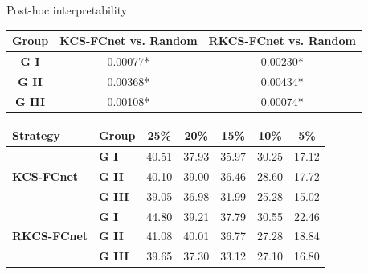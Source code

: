 \documentclass[aspectratio=169]{beamer}
\begin{document}
\begin{frame}{Post-hoc interpretability}
    \begin{table}[h!]
        \centering
        \begin{tabular}{|c|c|c|}
        \hline
        \textbf{Group} & \textbf{KCS-FCnet vs. Random} & \textbf{RKCS-FCnet vs. Random} \\ \hline
        \textbf{G I} & 0.00077* & 0.00230* \\
        \textbf{G II} & 0.00368* & 0.00434* \\
        \textbf{G III} & 0.00108* & 0.00074* \\ \hline
        \end{tabular}
        \end{table}

        \begin{table}[h!]
            \centering
            \begin{tabular}{|l|l|c|c|c|c|c|}
            \hline
            \textbf{Strategy} & \textbf{Group} & \textbf{25\%} & \textbf{20\%} & \textbf{15\%} & \textbf{10\%} & \textbf{5\%} \\ \hline
            \multirow{3}{*}{\textbf{KCS-FCnet}} & \textbf{G I} & 40.51 & 37.93 & 35.97 & 30.25 & 17.12 \\
             & \textbf{G II} & 40.10 & 39.00 & 36.46 & \cellcolor{GII!80}28.60 & 17.72 \\
             & \textbf{G III} & 39.05 & 36.98 & 31.99 & 25.28 & 15.02 \\ \hline
            \multirow{3}{*}{\textbf{RKCS-FCnet}} & \textbf{G I} &  44.80 & 39.21 &  37.79 &  30.55 & \cellcolor{GI!80} 22.46 \\
             & \textbf{G II} & 41.08 & 40.01 & 36.77 & 27.28 & 18.84 \\
             & \textbf{G III} & 39.65 & 37.30 & 33.12 & \cellcolor{GIII!70}27.10 & 16.80 \\ \hline
            \end{tabular}
            \end{table}
\end{frame}
\end{document}
